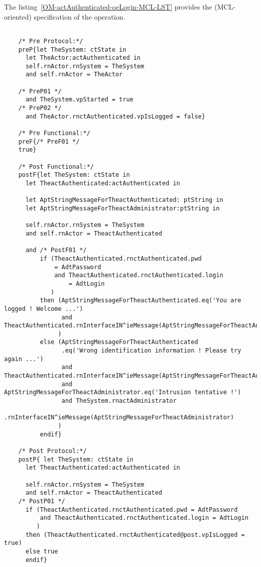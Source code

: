	\vspace{1cm}
	The listing~\ref{OM-actAuthenticated-oeLogin-MCL-LST} provides the \msrmessir (MCL-oriented) specification of the operation.
	
	\scriptsize
	\vspace{0.5cm}
	\begin{lstlisting}[style=MessirStyle,firstnumber=auto,captionpos=b,caption={\msrmessir (MCL-oriented) specification of the operation \emph{oeLogin}.},label=OM-actAuthenticated-oeLogin-MCL-LST]

	/* Pre Protocol:*/ 
	preP{let TheSystem: ctState in
	  let TheActor:actAuthenticated in
	  self.rnActor.rnSystem = TheSystem
	  and self.rnActor = TheActor
	  
	/* PreP01 */
	  and TheSystem.vpStarted = true
	/* PreP02 */
	  and TheActor.rnctAuthenticated.vpIsLogged = false}
	
	/* Pre Functional:*/
	preF{/* PreF01 */
	true}
	
	/* Post Functional:*/ 
	postF{let TheSystem: ctState in
	  let TheactAuthenticated:actAuthenticated in
	
	  let AptStringMessageForTheactAuthenticated: ptString in
	  let AptStringMessageForTheactAdministrator:ptString in
	  
	  self.rnActor.rnSystem = TheSystem
	  and self.rnActor = TheactAuthenticated
	  
	  and /* PostF01 */
	      if (TheactAuthenticated.rnctAuthenticated.pwd
	          = AdtPassword
	          and TheactAuthenticated.rnctAuthenticated.login
	              = AdtLogin
	         )
	      then (AptStringMessageForTheactAuthenticated.eq('You are logged ! Welcome ...')
	            and TheactAuthenticated.rnInterfaceIN^ieMessage(AptStringMessageForTheactAuthenticated)
	           )
	      else (AptStringMessageForTheactAuthenticated
	            .eq('Wrong identification information ! Please try again ...')
	            and TheactAuthenticated.rnInterfaceIN^ieMessage(AptStringMessageForTheactAuthenticated)
	            and AptStringMessageForTheactAdministrator.eq('Intrusion tentative !')
	            and TheSystem.rnactAdministrator
	                .rnInterfaceIN^ieMessage(AptStringMessageForTheactAdministrator)
	           )
	      endif}
	
	/* Post Protocol:*/ 
	postP{ let TheSystem: ctState in
	  let TheactAuthenticated:actAuthenticated in
	
	  self.rnActor.rnSystem = TheSystem
	  and self.rnActor = TheactAuthenticated
	/* PostP01 */
	  if (TheactAuthenticated.rnctAuthenticated.pwd = AdtPassword
	      and TheactAuthenticated.rnctAuthenticated.login = AdtLogin
	     )
	  then (TheactAuthenticated.rnctAuthenticated@post.vpIsLogged = true)
	  else true
	  endif}
	
	\end{lstlisting}
	\normalsize 
	
